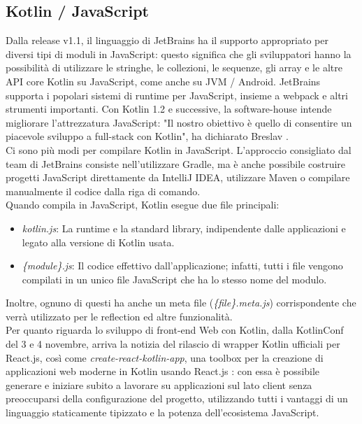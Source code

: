 \subsection{Kotlin / JavaScript}
Dalla release v1.1, il linguaggio di JetBrains ha il supporto appropriato per diversi tipi di moduli in JavaScript: questo significa che gli sviluppatori hanno la possibilità di utilizzare le stringhe, le collezioni, le sequenze, gli array e le altre API core Kotlin su JavaScript, come anche su JVM / Android. JetBrains supporta i popolari sistemi di runtime per JavaScript, insieme a webpack e altri strumenti importanti. Con Kotlin 1.2 e successive, la software-house intende migliorare l'attrezzatura JavaScript: "Il nostro obiettivo è quello di consentire un piacevole sviluppo a full-stack con Kotlin", ha dichiarato Breslav \cite{andreyBreslavInterview}.\\
Ci sono più modi per compilare Kotlin in JavaScript. L'approccio consigliato dal team di JetBrains consiste nell'utilizzare Gradle, ma è anche possibile costruire progetti JavaScript direttamente da IntelliJ IDEA, utilizzare Maven o compilare manualmente il codice dalla riga di comando.\\
Quando compila in JavaScript, Kotlin esegue due file principali:
\begin{itemize}
  \item {\em kotlin.js}: La runtime e la standard library, indipendente dalle applicazioni e legato alla versione di Kotlin   usata.
  \item {\em \{module\}.js}: Il codice effettivo dall'applicazione; infatti, tutti i file vengono compilati in un unico file JavaScript che ha lo stesso nome del modulo.
\end{itemize}
Inoltre, ognuno di questi ha anche un meta file ({\em \{file\}.meta.js}) corrispondente che verrà utilizzato per le reflection ed altre funzionalità.\\
Per quanto riguarda lo sviluppo di front-end Web con Kotlin, dalla KotlinConf del 3 e 4 novembre, arriva la notizia del rilascio di wrapper Kotlin ufficiali per React.js, così come {\em create-react-kotlin-app}, una toolbox per la creazione di applicazioni web moderne in Kotlin usando React.js \cite{createReactKtApp}: con essa è possibile generare e iniziare subito a lavorare su applicazioni sul lato client senza preoccuparsi della configurazione del progetto, utilizzando tutti i vantaggi di un linguaggio staticamente tipizzato e la potenza dell'ecosistema JavaScript.\\

